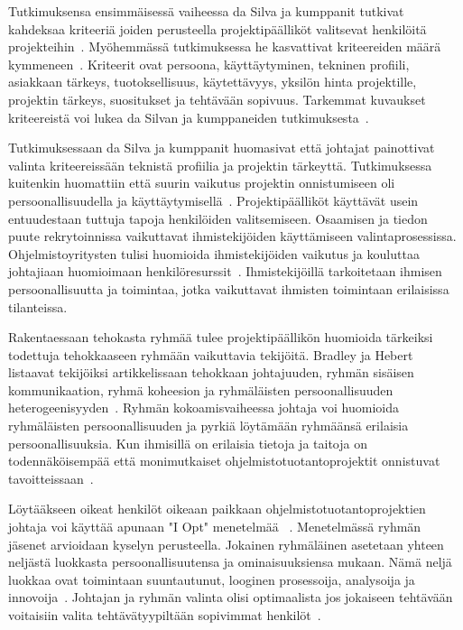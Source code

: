 \documentclass[finnish]{tktltiki2}
\theoremstyle{definition}
\theoremstyle{remark}
\begin{document}
Tutkimuksensa ensimmäisessä vaiheessa da Silva ja kumppanit tutkivat kahdeksaa kriteeriä joiden perusteella projektipäälliköt valitsevat henkilöitä projekteihin~\cite{francca2009quantitative}. Myöhemmässä tutkimuksessa he kasvattivat kriteereiden määrä kymmeneen~\cite{daSilva2012}. Kriteerit ovat persoona, käyttäytyminen, tekninen profiili, asiakkaan tärkeys, tuotoksellisuus, käytettävyys, yksilön hinta projektille, projektin tärkeys, suositukset ja tehtävään sopivuus. Tarkemmat kuvaukset kriteereistä voi lukea da Silvan ja kumppaneiden tutkimuksesta~\cite{daSilva2012}.

Tutkimuksessaan da Silva ja kumppanit huomasivat että johtajat painottivat valinta kriteereissään teknistä profiilia ja projektin tärkeyttä. Tutkimuksessa kuitenkin huomattiin että suurin vaikutus projektin onnistumiseen oli persoonallisuudella ja käyttäytymisellä~\cite{daSilva2012}. Projektipäälliköt käyttävät usein entuudestaan tuttuja tapoja henkilöiden valitsemiseen. Osaamisen ja tiedon puute rekrytoinnissa vaikuttavat ihmistekijöiden käyttämiseen valintaprosessissa. Ohjelmistoyritysten tulisi huomioida ihmistekijöiden vaikutus ja kouluttaa johtajiaan huomioimaan henkilöresurssit~\cite{daSilva2012}. Ihmistekijöillä tarkoitetaan ihmisen persoonallisuutta ja toimintaa, jotka vaikuttavat ihmisten toimintaan erilaisissa tilanteissa.

Rakentaessaan tehokasta ryhmää tulee projektipäällikön huomioida tärkeiksi todettuja tehokkaaseen ryhmään vaikuttavia tekijöitä. Bradley ja Hebert listaavat tekijöiksi artikkelissaan tehokkaan johtajuuden, ryhmän sisäisen kommunikaation, ryhmä koheesion ja ryhmäläisten persoonallisuuden heterogeenisyyden~\cite{bradley1997effect}. Ryhmän kokoamisvaiheessa johtaja voi huomioida ryhmäläisten persoonallisuuden ja pyrkiä löytämään ryhmäänsä erilaisia persoonallisuuksia. Kun ihmisillä on erilaisia tietoja ja taitoja on todennäköisempää että monimutkaiset ohjelmistotuotantoprojektit onnistuvat tavoitteissaan~\cite{bradley1997effect}.

Löytääkseen oikeat henkilöt oikeaan paikkaan ohjelmistotuotantoprojektien johtaja voi käyttää apunaan "I Opt" menetelmää ~\cite{Dhomne:2012:ITL:2382887.2382899, kliem1996teambuilding}. Menetelmässä ryhmän jäsenet arvioidaan kyselyn perusteella. Jokainen ryhmäläinen asetetaan yhteen neljästä luokkasta persoonallisuutensa ja ominaisuuksiensa mukaan. Nämä neljä luokkaa ovat toimintaan suuntautunut, looginen prosessoija, analysoija ja innovoija~\cite{ kliem1996teambuilding}. Johtajan ja ryhmän valinta olisi optimaalista jos jokaiseen tehtävään voitaisiin valita tehtävätyypiltään sopivimmat henkilöt~\cite{Dhomne:2012:ITL:2382887.2382899}.
\end{document}
